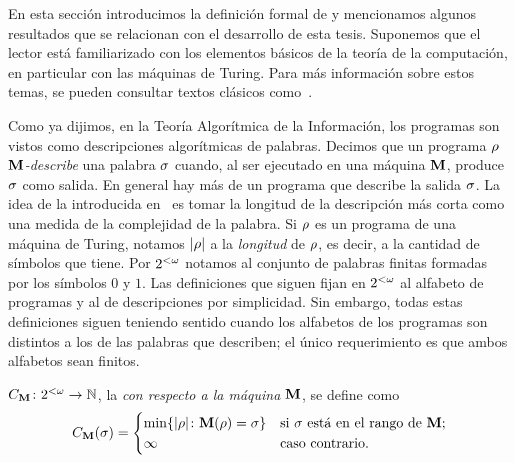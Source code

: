
En esta sección introducimos la definición formal de \kolcomp y mencionamos algunos resultados que se relacionan con el desarrollo de esta tesis. Suponemos que el lector está familiarizado con los elementos básicos de la teoría de la computación, en particular con las máquinas de Turing. Para más información sobre estos temas, se pueden consultar textos clásicos como~\cite{O99,R87,S87}.

Como ya dijimos, en la Teoría Algorítmica de la Información, los programas son vistos como descripciones algorítmicas de palabras. Decimos que un programa $\rho$
{\em ${\bf M}$-describe} una palabra $\sigma$ cuando, al ser ejecutado en una máquina ${\bf M}$, produce $\sigma$ como salida. En general
hay más de un programa que describe la salida $\sigma$.
La idea de la \kolcomp introducida en~\cite{kolmogorov1965three,solomonoff1964formal,chaitin1975theory} es tomar la longitud de la descripción más corta como una medida de la complejidad de la palabra. Si $\rho$ es un programa de una máquina de Turing, notamos $| \rho |$ a la {\em longitud} de $\rho$, es decir, a la cantidad de símbolos que tiene. Por $2^{<\omega}$ notamos al conjunto de palabras finitas formadas por los símbolos $0$ y $1$. Las definiciones que siguen fijan en $2^{<\omega}$ al alfabeto de programas y al de descripciones por simplicidad. Sin embargo, todas estas definiciones siguen teniendo sentido cuando los alfabetos de los programas son distintos a los de las palabras que describen; el único requerimiento es que ambos alfabetos sean finitos.
%
\begin{definicion}[\kolcomp]\label{intro:def:plainC}
$C_{{\bf M}}\colon2^{<\omega} \to \mathbb{N}$, la {\em 
\kolcomp con respecto a la máquina ${\bf M}$}, se define como
$$
C_{{\bf M}}(\sigma)=
    \begin{cases}
    \min \{| \rho |\colon {\bf M}(\rho)=\sigma \} & \textrm{si $\sigma$ está en el rango de ${\bf M}$};\\
    \infty & \textrm{caso contrario.}
    \end{cases}
$$
\end{definicion}



